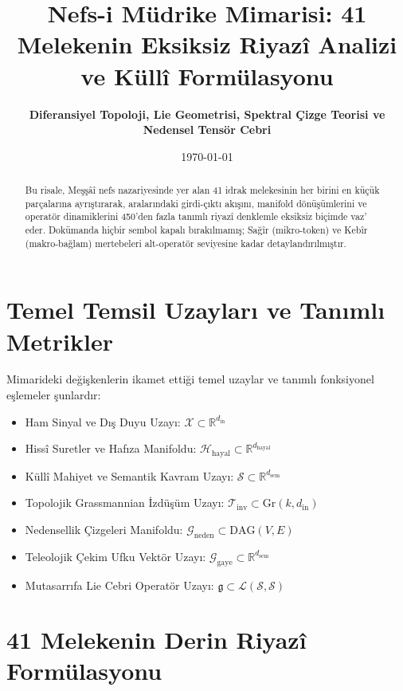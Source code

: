 \documentclass[11pt, a4paper]{article}
\title{\textbf{Nefs-i Müdrike Mimarisi: 41 Melekenin Eksiksiz Riyazî Analizi ve Küllî Formülasyonu}}
\author{\textbf{Diferansiyel Topoloji, Lie Geometrisi, Spektral Çizge Teorisi ve Nedensel Tensör Cebri}}
\date{\today}
\begin{document}
\maketitle

\begin{abstract}
Bu risale, Meşşâî nefs nazariyesinde yer alan 41 idrak melekesinin her birini en küçük parçalarına ayrıştırarak, aralarındaki girdi-çıktı akışını, manifold dönüşümlerini ve operatör dinamiklerini 450'den fazla tanımlı riyazî denklemle eksiksiz biçimde vaz' eder. Dokümanda hiçbir sembol kapalı bırakılmamış; Sağîr (mikro-token) ve Kebîr (makro-bağlam) mertebeleri alt-operatör seviyesine kadar detaylandırılmıştır.
\end{abstract}

\section{Temel Temsil Uzayları ve Tanımlı Metrikler}

Mimarideki değişkenlerin ikamet ettiği temel uzaylar ve tanımlı fonksiyonel eşlemeler şunlardır:
\begin{itemize}
    \item Ham Sinyal ve Dış Duyu Uzayı: $\mathcal{X} \subset \mathbb{R}^{d_{\text{in}}}$
    \item Hissî Suretler ve Hafıza Manifoldu: $\mathcal{H}_{\text{hayal}} \subset \mathbb{R}^{d_{\text{hayal}}}$
    \item Küllî Mahiyet ve Semantik Kavram Uzayı: $\mathcal{S} \subset \mathbb{R}^{d_{\text{sem}}}$
    \item Topolojik Grassmannian İzdüşüm Uzayı: $\mathcal{T}_{\text{inv}} \subset \text{Gr}(k, d_{\text{in}})$
    \item Nedensellik Çizgeleri Manifoldu: $\mathcal{G}_{\text{neden}} \subset \text{DAG}(V, E)$
    \item Teleolojik Çekim Ufku Vektör Uzayı: $\mathcal{G}_{\text{gaye}} \subset \mathbb{R}^{d_{\text{sem}}}$
    \item Mutasarrıfa Lie Cebri Operatör Uzayı: $\mathfrak{g} \subset \mathcal{L}(\mathcal{S}, \mathcal{S})$
\end{itemize}

\section{41 Melekenin Derin Riyazî Formülasyonu}
\end{document}
